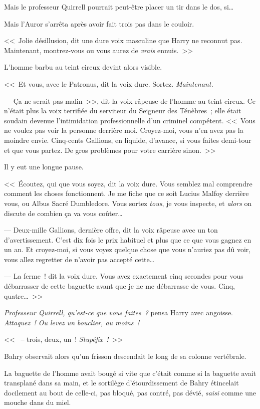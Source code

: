 Mais le professeur Quirrell pourrait peut-être placer un tir dans le dos, si…

Mais l'Auror s'arrêta après avoir fait trois pas dans le couloir.

<<~Jolie désillusion, dit une dure voix masculine que Harry ne reconnut pas. Maintenant, montrez-vous ou vous aurez de \emph{vrais} ennuis.~>>

L'homme barbu au teint cireux devint alors visible.

<<~Et vous, avec le Patronus, dit la voix dure. Sortez. \emph{Maintenant.}

--- Ça ne serait pas malin~>>, dit la voix râpeuse de l'homme au teint cireux. Ce n'était plus la voix terrifiée du serviteur du Seigneur des Ténèbres~; elle était soudain devenue l'intimidation professionnelle d'un criminel compétent. <<~Vous ne voulez pas voir la personne derrière moi. Croyez-moi, vous n'en avez pas la moindre envie. Cinq-cents Gallions, en liquide, d'avance, si vous faites demi-tour et que vous partez. De gros problèmes pour votre carrière sinon.~>>

Il y eut une longue pause.

<<~Écoutez, qui que vous soyez, dit la voix dure. Vous semblez mal comprendre comment les choses fonctionnent. Je me fiche que ce soit Lucius Malfoy derrière vous, ou Albus Sacré Dumbledore. Vous sortez \emph{tous}, je vous inspecte, et \emph{alors} on discute de combien ça va vous coûter…

--- Deux-mille Gallions, dernière offre, dit la voix râpeuse avec un ton d'avertissement. C'est dix fois le prix habituel et plus que ce que vous gagnez en un an. Et croyez-moi, si vous voyez quelque chose que vous n'auriez pas dû voir, vous allez regretter de n'avoir pas accepté cette…

--- La ferme~! dit la voix dure. Vous avez exactement cinq secondes pour vous débarrasser de cette baguette avant que je ne me débarrasse de vous. Cinq, quatre…~>>

\emph{Professeur Quirrell, qu'est-ce que vous faites~?} pensa Harry avec angoisse. \emph{Attaquez~! Ou levez un bouclier, au moins~!}

<<~ -- trois, deux, un~! \emph{Stupéfix~!}~>>

\later

Bahry observait alors qu'un frisson descendait le long de sa colonne vertébrale.

La baguette de l'homme avait bougé si vite que c'était comme si la baguette avait transplané dans sa main, et le sortilège d'étourdissement de Bahry étincelait docilement au bout de celle-ci, pas bloqué, pas contré, pas dévié, \emph{saisi} comme une mouche dans du miel.

